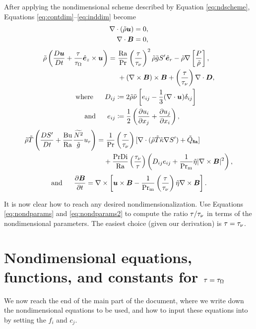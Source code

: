 \documentclass[12pt]{article}
\numberwithin{equation}{section}
\newcommand{\tauovertaunu}{\left(\frac{\tau}{\taunu}\right)}
\begin{document}
	After applying the nondimensional scheme described by Equation \eqref{eq:ndscheme}, Equations \eqref{eq:contdim}--\eqref{eq:inddim} become 
	\begin{align}
	\nabla\cdot(\tilde{\rho}\bm{u}) &= 0\label{eq:contnd},\\
	\nabla\cdot \bm{B} &= 0,
\end{align}
\begin{subequations}\label{eq:momnd}
	\begin{align}
		\rhotilde\left(\matderiv{\vecu}+\frac{\tau}{\tauomega}\ez\times\vecu\right) = &\ \frac{\ra}{\pr}\left(\frac{\tau}{\taunu}\right)^2\rhotilde\gtilde \entrprime\er         -\rhotilde\nabla\left[ \frac{P}{\rhotilde} \right], \nonumber\\
		&\ +(\curl\vecb)\times\vecb +\tauovertaunu\Div\bm{D},\\
		\where D_{ij} &\define 2\rhotilde\nutilde \left[e_{ij} - \frac{1}{3}(\Div\vecu) \delta_{ij} \right]\\
		\andd e_{ij} &\define \frac{1}{2}\left(\pderiv{u_i}{x_j} + \pderiv{u_j}{x_i} \right),
	\end{align}
\end{subequations}
\begin{align}\label{eq:ennd}
	\rhotilde\tmptilde\left( \matderiv{\entrprime} + \frac{\bu}{\ra}\frac{\nsqtilde}{\gtilde} u_r\right)  = &\ \frac{1}{\pr}\tauovertaunu[\Div(\rhotilde \tmptilde \kappatilde \nabla \entrprime) + \heatra] \nonumber \\
	& + \frac{\pr\di}{\ra}\left(\frac{\taunu}{\tau}\right)\left( D_{ij}e_{ij} + \frac{1}{\prm} \etatilde|\curl\vecb|^2\right),
\end{align}
\begin{align}\label{eq:indnd}
	\andd \pderiv{\vecb}{t} = \curl\left[\vecu\times\vecb - \frac{1}{\prm}\tauovertaunu\etatilde\curl\vecb\right].
\end{align}	

It is now clear how to reach any desired nondimensionalization. Use Equations \eqref{eq:nondparams} and \eqref{eq:nondparams2} to compute the ratio $\tau/\tau_{\nu}$ in terms of the nondimensional parameters. The easiest choice (given our derivation) is $\tau=\tau_{\nu}$.

\section{Nondimensional equations, functions, and constants for $\tau=\tau_\Omega$}\label{sec:eqndrot}
We now reach the end of the main part of the document, where we write down the nondimensional equations to be used, and how to input these equations into {\rayleigh} by setting the $f_i$ and $c_j$. 
\end{document}
